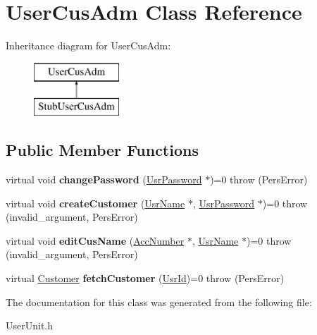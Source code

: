 \hypertarget{classUserCusAdm}{\section{User\-Cus\-Adm Class Reference}
\label{d1/d48/classUserCusAdm}
}
Inheritance diagram for User\-Cus\-Adm\-:\begin{figure}[H]
\begin{center}
\leavevmode
\includegraphics[height=2.000000cm]{d1/d48/classUserCusAdm}
\end{center}
\end{figure}
\subsection*{Public Member Functions}
\begin{DoxyCompactItemize}
\item 
\hypertarget{classUserCusAdm_aa78ba1b0eb4f14ca68f8ef2318e9c3d1}{virtual void {\bfseries change\-Password} (\hyperlink{classUsrPassword}{Usr\-Password} $\ast$)=0  throw (\-Pers\-Error)}\label{d1/d48/classUserCusAdm_aa78ba1b0eb4f14ca68f8ef2318e9c3d1}

\item 
\hypertarget{classUserCusAdm_afc190444ef3834236b8057bc876ee106}{virtual void {\bfseries create\-Customer} (\hyperlink{classUsrName}{Usr\-Name} $\ast$, \hyperlink{classUsrPassword}{Usr\-Password} $\ast$)=0  throw (invalid\-\_\-argument, Pers\-Error)}\label{d1/d48/classUserCusAdm_afc190444ef3834236b8057bc876ee106}

\item 
\hypertarget{classUserCusAdm_a6105bcc548efb475bae0bc36b58743a2}{virtual void {\bfseries edit\-Cus\-Name} (\hyperlink{classAccNumber}{Acc\-Number} $\ast$, \hyperlink{classUsrName}{Usr\-Name} $\ast$)=0  throw (invalid\-\_\-argument, Pers\-Error)}\label{d1/d48/classUserCusAdm_a6105bcc548efb475bae0bc36b58743a2}

\item 
\hypertarget{classUserCusAdm_a8a67bf25c965e931be912f33449e0f8a}{virtual \hyperlink{classCustomer}{Customer} {\bfseries fetch\-Customer} (\hyperlink{classUsrId}{Usr\-Id})=0  throw (\-Pers\-Error)}\label{d1/d48/classUserCusAdm_a8a67bf25c965e931be912f33449e0f8a}

\end{DoxyCompactItemize}


The documentation for this class was generated from the following file\-:\begin{DoxyCompactItemize}
\item 
User\-Unit.\-h\end{DoxyCompactItemize}
